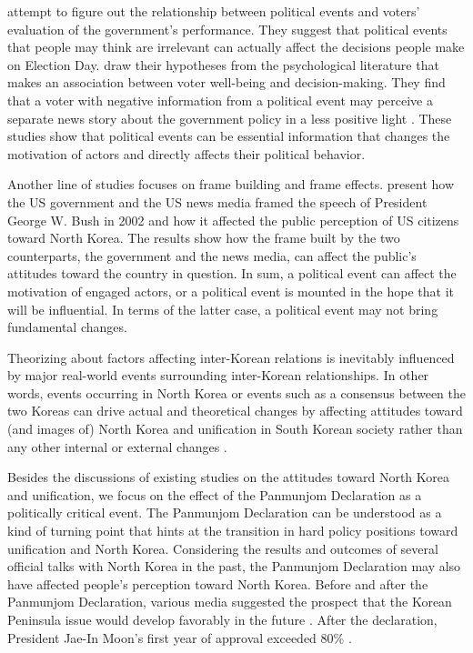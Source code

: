 \documentclass[letterpaper,9pt,twocolumn,twoside,]{pinp}
\begin{document}
\citet{Healy2010} attempt to figure out the relationship between
political events and voters' evaluation of the government's performance.
They suggest that political events that people may think are irrelevant
can actually affect the decisions people make on Election Day.
\citet{Healy2010} draw their hypotheses from the psychological
literature that makes an association between voter well-being and
decision-making. They find that a voter with negative information from a
political event may perceive a separate news story about the government
policy in a less positive light \citep[12807]{Healy2010}. These studies
show that political events can be essential information that changes the
motivation of actors and directly affects their political behavior.

Another line of studies focuses on frame building and frame effects.
\citet{Lim2009} present how the US government and the US news media
framed the speech of President George W. Bush in 2002 and how it
affected the public perception of US citizens toward North Korea. The
results show how the frame built by the two counterparts, the government
and the news media, can affect the public's attitudes toward the country
in question. In sum, a political event can affect the motivation of
engaged actors, or a political event is mounted in the hope that it will
be influential. In terms of the latter case, a political event may not
bring fundamental changes.

Theorizing about factors affecting inter-Korean relations is inevitably
influenced by major real-world events surrounding inter-Korean
relationships. In other words, events occurring in North Korea or events
such as a consensus between the two Koreas can drive actual and
theoretical changes by affecting attitudes toward (and images of) North
Korea and unification in South Korean society rather than any other
internal or external changes
\citetext{\citealp[158]{Kim2017}; \citealp{Kim2008}; \citealp{Kim2003}}.

Besides the discussions of existing studies on the attitudes toward
North Korea and unification, we focus on the effect of the Panmunjom
Declaration as a politically critical event. The Panmunjom Declaration
can be understood as a kind of turning point that hints at the
transition in hard policy positions toward unification and North Korea.
Considering the results and outcomes of several official talks with
North Korea in the past, the Panmunjom Declaration may also have
affected people's perception toward North Korea. Before and after the
Panmunjom Declaration, various media suggested the prospect that the
Korean Peninsula issue would develop favorably in the future
\citep{Kim2018b, Smith2018}. After the declaration, President Jae-In
Moon's first year of approval exceeded 80\% \citep{Oh2018, Cho2018}.
\end{document}
